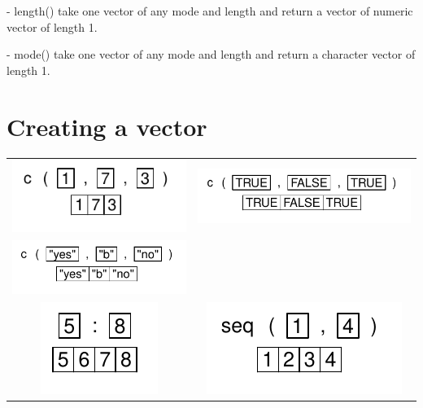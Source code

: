 \documentclass[pdflatex]{article}
\begin{document}
- length() take one vector of any mode and length and return a vector of numeric vector of length 1.

- mode() take one vector of any mode and length and return a character vector of length 1.


\section{Creating a vector}

\begin{tabular}{cc}
\includegraphics{c_1} & \includegraphics{c_2}\\
\includegraphics{c_3} & \\
\includegraphics{operator_sequence} & \includegraphics{seq}\\

\end{tabular}
\end{document}
